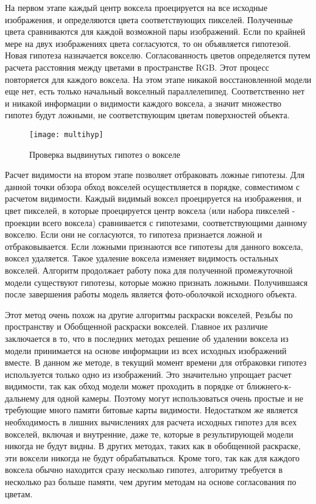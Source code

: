 На первом этапе каждый центр воксела проецируется на все исходные изображения, и определяются цвета соответствующих пикселей. Полученные цвета сравниваются для каждой возможной пары изображений. Если по крайней мере на двух изображениях цвета согласуются, то он объявляется гипотезой. Новая гипотеза назначается вокселю. Согласованность цветов определяется путем расчета расстояния между цветами в пространстве RGB. Этот процесс повторяется для каждого воксела. На этом этапе никакой восстановленной модели еще нет, есть только начальный вокселный параллелепипед. Соответственно нет и никакой информации о видимости каждого воксела, а значит множество гипотез будут ложными, не соответствующим цветам поверхностей объекта.
\begin{figure}[h]
\center
\texttt{[image: multihyp]}
\caption{Проверка выдвинутых гипотез о вокселе}
\end{figure}

Расчет видимости на втором этапе позволяет отбраковать ложные гипотезы. Для данной точки обзора обход вокселей осуществляется в порядке, совместимом с расчетом видимости. Каждый видимый воксел проецируется на изображения, и цвет пикселей, в которые проецируется центр воксела (или набора пикселей - проекции всего воксела) сравнивается с гипотезами, соответствующими данному вокселю. Если они не согласуются, то гипотеза признается ложной и отбраковывается. Если ложными признаются все гипотезы для данного воксела, воксел удаляется. Такое удаление воксела изменяет видимость остальных вокселей. Алгоритм продолжает работу пока для полученной промежуточной модели существуют гипотезы, которые можно признать ложными. Получившаяся после завершения работы модель является фото-оболочкой исходного объекта.

Этот метод очень похож на другие алгоритмы раскраски вокселей, Резьбы по пространству и Обобщенной раскраски вокселей. Главное их различие заключается в то, что в последних методах решение об удалении воксела из модели принимается на основе информации из всех исходных изображений вместе. В данном же методе, в текущий момент времени для отбраковки гипотез используется только одно из изображений. Это значительно упрощает расчет видимости, так как обход модели может проходить в порядке от ближнего-к-дальнему для одной камеры. Поэтому могут использоваться очень простые и не требующие много памяти битовые карты видимости. Недостатком же является необходимость в лишних вычислениях для расчета исходных гипотез для всех вокселей, включая и внутренние, даже те, которые в результирующей модели никогда не будут видны. В других методах, таких как в обобщенной раскраске, эти воксели никогда не будут обрабатываться. Кроме того, так как для каждого воксела обычно находится сразу несколько гипотез, алгоритму требуется в несколько раз больше памяти, чем другим методам на основе согласования по цветам.

